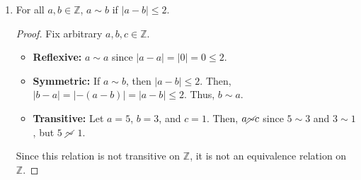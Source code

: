 \documentclass{article}
\begin{document}
\begin{enumerate}
\begin{enumerate}
			\item For all $a, b \in \mathbb{Z}$, $a \sim b$ if $|a - b| \le 2$.
                    \begin{proof} Fix arbitrary $a, b, c \in \mathbb{Z}$.
                        \begin{itemize}
                            \item \textbf{Reflexive:} $a \sim a$ since $|a - a| = |0| = 0 \le 2$.
                            \item \textbf{Symmetric:} If $a \sim b$, then $|a - b| \le 2$. Then, $|b - a| = |\minus(a - b)| = |a - b| \le 2$. Thus, $b \sim a$. 
                            \item \textbf{Transitive:} Let $a = 5$, $b = 3$, and $c = 1$. Then, $a \cancel{\sim} c$ since $5 \sim 3$ and $3 \sim 1$, but $5$ $\cancel{\sim}$ $1$.
                        \end{itemize}
                        Since this relation is not transitive on $\mathbb{Z}$, it is not an equivalence relation on $\mathbb{Z}$.
                    \end{proof}


\end{enumerate}
\end{enumerate}
\end{document}
